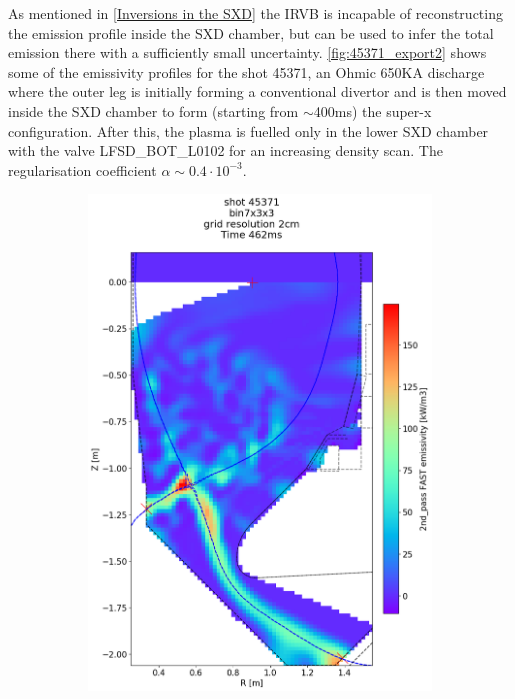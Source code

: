As mentioned in \autoref{Inversions in the SXD} the IRVB is incapable of reconstructing the emission profile inside the SXD chamber, but can be used to infer the total emission there with a sufficiently small uncertainty. \autoref{fig:45371_export2} shows some of the emissivity profiles for the shot 45371, an Ohmic 650KA discharge where the outer leg is initially forming a conventional divertor and is then moved inside the SXD chamber to form (starting from $\sim$400ms) the super-x configuration. After this, the plasma is fuelled only in the lower SXD chamber with the valve LFSD\_BOT\_L0102 for an increasing density scan. The regularisation coefficient $\alpha \sim 0.4 \cdot 10^{-3}$.
\begin{figure}[!ht]
     \centering
     \begin{subfigure}{0.395\linewidth}
         \centering
         \includegraphics[trim={75 40 0 190},clip,width=\textwidth]{Chapters/chapter2/figs/IRVB-MASTU_shot-45371_export_7.png}

\end{subfigure}
\end{figure}

